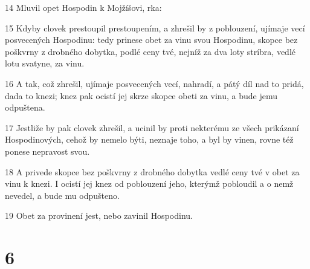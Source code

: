 \par 14 Mluvil opet Hospodin k Mojžíšovi, rka:
\par 15 Kdyby clovek prestoupil prestoupením, a zhrešil by z poblouzení, ujímaje vecí posvecených Hospodinu: tedy prinese obet za vinu svou Hospodinu, skopce bez poškvrny z drobného dobytka, podlé ceny tvé, nejníž za dva loty stríbra, vedlé lotu svatyne, za vinu.
\par 16 A tak, což zhrešil, ujímaje posvecených vecí, nahradí, a pátý díl nad to pridá, dada to knezi; knez pak ocistí jej skrze skopce obeti za vinu, a bude jemu odpuštena.
\par 17 Jestliže by pak clovek zhrešil, a ucinil by proti nekterému ze všech prikázaní Hospodinových, cehož by nemelo býti, neznaje toho, a byl by vinen, rovne též ponese nepravost svou.
\par 18 A privede skopce bez poškvrny z drobného dobytka vedlé ceny tvé v obet za vinu k knezi. I ocistí jej knez od poblouzení jeho, kterýmž pobloudil a o nemž nevedel, a bude mu odpušteno.
\par 19 Obet za provinení jest, nebo zavinil Hospodinu.

\chapter{6}

